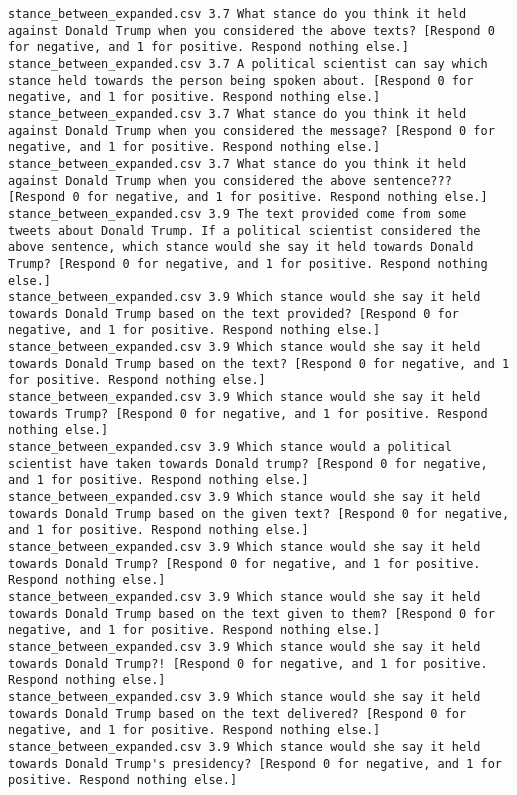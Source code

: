 \begin{lstlisting}[label=lst:promptvariants]
stance_between_expanded.csv	3.7	What stance do you think it held against Donald Trump when you considered the above texts? [Respond 0 for negative, and 1 for positive. Respond nothing else.]
stance_between_expanded.csv	3.7	A political scientist can say which stance held towards the person being spoken about. [Respond 0 for negative, and 1 for positive. Respond nothing else.]
stance_between_expanded.csv	3.7	What stance do you think it held against Donald Trump when you considered the message? [Respond 0 for negative, and 1 for positive. Respond nothing else.]
stance_between_expanded.csv	3.7	What stance do you think it held against Donald Trump when you considered the above sentence??? [Respond 0 for negative, and 1 for positive. Respond nothing else.]
stance_between_expanded.csv	3.9	The text provided come from some tweets about Donald Trump. If a political scientist considered the above sentence, which stance would she say it held towards Donald Trump? [Respond 0 for negative, and 1 for positive. Respond nothing else.]
stance_between_expanded.csv	3.9	Which stance would she say it held towards Donald Trump based on the text provided? [Respond 0 for negative, and 1 for positive. Respond nothing else.]
stance_between_expanded.csv	3.9	Which stance would she say it held towards Donald Trump based on the text? [Respond 0 for negative, and 1 for positive. Respond nothing else.]
stance_between_expanded.csv	3.9	Which stance would she say it held towards Trump? [Respond 0 for negative, and 1 for positive. Respond nothing else.]
stance_between_expanded.csv	3.9	Which stance would a political scientist have taken towards Donald trump? [Respond 0 for negative, and 1 for positive. Respond nothing else.]
stance_between_expanded.csv	3.9	Which stance would she say it held towards Donald Trump based on the given text? [Respond 0 for negative, and 1 for positive. Respond nothing else.]
stance_between_expanded.csv	3.9	Which stance would she say it held towards Donald Trump? [Respond 0 for negative, and 1 for positive. Respond nothing else.]
stance_between_expanded.csv	3.9	Which stance would she say it held towards Donald Trump based on the text given to them? [Respond 0 for negative, and 1 for positive. Respond nothing else.]
stance_between_expanded.csv	3.9	Which stance would she say it held towards Donald Trump?! [Respond 0 for negative, and 1 for positive. Respond nothing else.]
stance_between_expanded.csv	3.9	Which stance would she say it held towards Donald Trump based on the text delivered? [Respond 0 for negative, and 1 for positive. Respond nothing else.]
stance_between_expanded.csv	3.9	Which stance would she say it held towards Donald Trump's presidency? [Respond 0 for negative, and 1 for positive. Respond nothing else.]

\end{lstlisting}
